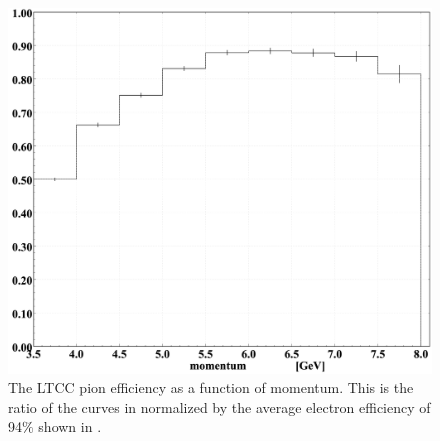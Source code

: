 \begin{figure}
	\centering
	\includegraphics[width=0.98\columnwidth,keepaspectratio]{img/pionEfficiency.png}
	\caption{The LTCC pion efficiency as a function of momentum. This is the ratio of the curves in 
				normalized by the average electron efficiency of 94$\%$ shown in .}
	\label{fig:pionEfficiency}
\end{figure}
